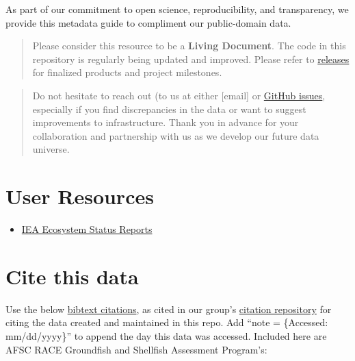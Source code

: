 \documentclass[
  letterpaper,
  oneside,
  open=any]{scrbook}
\providecommand{\tightlist}{%
  \setlength{\itemsep}{0pt}\setlength{\parskip}{0pt}}\usepackage{longtable,booktabs,array}
\begin{document}

As part of our commitment to open science, reproducibility, and
transparency, we provide this metadata guide to compliment our
public-domain data.

\begin{quote}
Please consider this resource to be a \textbf{Living Document}. The code
in this repository is regularly being updated and improved. Please refer
to
\href{https://github.com/IEA-Data/IEA_Data_Guidance_Doc//releases}{releases}
for finalized products and project milestones.
\end{quote}

\begin{quote}
Do not hesitate to reach out (to us at either {[}email{]} or
\href{https://github.com/IEA-Data/IEA_Data_Guidance_Doc//issues}{GitHub
issues}, especially if you find discrepancies in the data or want to
suggest improvements to infrastructure. Thank you in advance for your
collaboration and partnership with us as we develop our future data
universe.
\end{quote}

\hypertarget{user-resources}{%
\section*{User Resources}\label{user-resources}}


\begin{itemize}
\tightlist
\item
  \href{https://www.integratedecosystemassessment.noaa.gov/ecosystem-status-reports}{IEA
  Ecosystem Status Reports}
\end{itemize}

\hypertarget{cite-this-data}{%
\section*{Cite this data}\label{cite-this-data}}


Use the below
\href{https://github.com/IEA-Data/IEA_Data_Guidance_Doc//blob/main/CITATION.bib}{bibtext
citations}, as cited in our group's
\href{https://github.com/IEA-Data/citations/blob/main/cite/bibliography.bib}{citation
repository} for citing the data created and maintained in this repo. Add
``note = \{Accessed: mm/dd/yyyy\}'' to append the day this data was
accessed. Included here are AFSC RACE Groundfish and Shellfish
Assessment Program's:
\end{document}
